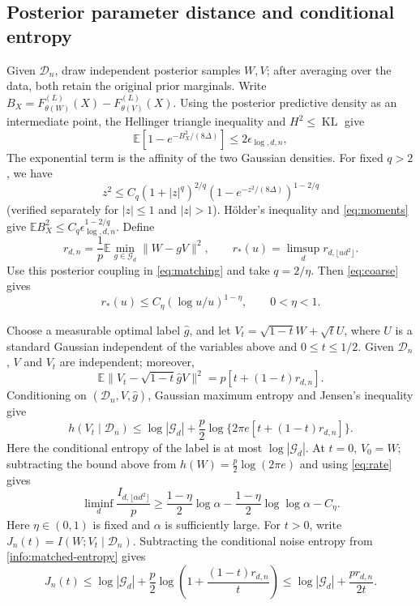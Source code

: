 \documentclass[a4paper]{tufte-handout}
\newcommand{\E}{\mathbb E}
\DeclareMathOperator{\KL}{KL}
\begin{document}
\begin{fullwidth}
\subsection{Posterior parameter distance and conditional entropy}
Given $\mathcal D_n$, draw independent posterior samples $W,V$; after averaging over the data, both retain the original prior marginals.
Write $B_X=F_{\theta(W)}^{(L)}(X)-F_{\theta(V)}^{(L)}(X)$.
Using the posterior predictive density as an intermediate point, the Hellinger triangle inequality and $H^2\le\KL$ give
\begin{equation}\label{eq:hellinger}
 \E[1-e^{-B_X^2/(8\Delta)}]\le2\epsilon_{\log,d,n},
\end{equation}
The exponential term is the affinity of the two Gaussian densities. For fixed $q>2$, we have
\[
 z^2\le C_q(1+|z|^q)^{2/q}
          (1-e^{-z^2/(8\Delta)})^{1-2/q}
\]
(verified separately for $|z|\le1$ and $|z|>1$). H\"older's inequality and \eqref{eq:moments} give
$\E B_X^2\le C_q\epsilon_{\log,d,n}^{1-2/q}$. Define
\[
 r_{d,n}=\frac1p\E\min_{g\in\mathcal G_d}\|W-gV\|^2,
 \qquad r_*(u)=\limsup_d r_{d,\lfloor ud^2\rfloor}.
\]
Use this posterior coupling in \eqref{eq:matching} and take $q=2/\eta$. Then \eqref{eq:coarse} gives
\begin{equation}\label{eq:rate}
 r_*(u)\le C_\eta(\log u/u)^{1-\eta},\qquad0<\eta<1.
\end{equation}

Choose a measurable optimal label $\widehat g$, and let
$V_t=\sqrt{1-t}W+\sqrt tU$, where $U$ is a standard Gaussian independent of the variables above and $0\le t\le1/2$.
Given $\mathcal D_n$, $V$ and $V_t$ are independent; moreover,
\[
 \E\|V_t-\sqrt{1-t}\widehat gV\|^2=p[t+(1-t)r_{d,n}].
\]
Conditioning on $(\mathcal D_n,V,\widehat g)$, Gaussian maximum entropy and Jensen's inequality give
\begin{equation}\label{info:matched-entropy}
 h(V_t\mid\mathcal D_n)
 \le\log|\mathcal G_d|+\frac p2\log\{2\pi e[t+(1-t)r_{d,n}]\}.
\end{equation}
Here the conditional entropy of the label is at most $\log|\mathcal G_d|$.
At $t=0$, $V_0=W$; subtracting the bound above from $h(W)=\frac p2\log(2\pi e)$ and using \eqref{eq:rate} gives
\begin{equation}\label{eq:sample-information-lower}
 \liminf_d\frac{I_{d,\lfloor\alpha d^2\rfloor}}p
 \ge\frac{1-\eta}{2}\log\alpha
       -\frac{1-\eta}{2}\log\log\alpha-C_\eta.
\end{equation}
Here $\eta\in(0,1)$ is fixed and $\alpha$ is sufficiently large.
For $t>0$, write $J_n(t)=I(W;V_t\mid\mathcal D_n)$.
Subtracting the conditional noise entropy from \eqref{info:matched-entropy} gives
\begin{equation}\label{alt:oracle-cost}
 J_n(t)\le\log|\mathcal G_d|+\frac p2\log\left(1+\frac{(1-t)r_{d,n}}t\right)
 \le\log|\mathcal G_d|+\frac{p r_{d,n}}{2t}.
\end{equation}


\end{fullwidth}
\end{document}
